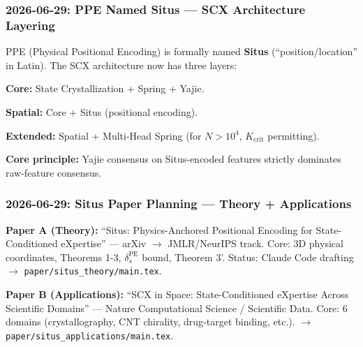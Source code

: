 \documentclass[12pt]{article}
\begin{document}
\subsubsection{2026-06-29: PPE Named Situs --- SCX Architecture Layering}
PPE (Physical Positional Encoding) is formally named \textbf{Situs} (``position/location'' in Latin). The SCX architecture now has three layers:\par
\textbf{Core:} State Crystallization + Spring + Yajie.\par
\textbf{Spatial:} Core + Situs (positional encoding).\par
\textbf{Extended:} Spatial + Multi-Head Spring (for \(N > 10^4\), \(K_{\text{crit}}\) permitting).\par
\textbf{Core principle:} Yajie consensus on Situs-encoded features strictly dominates raw-feature consensus.

\subsubsection{2026-06-29: Situs Paper Planning --- Theory + Applications}
\textbf{Paper A (Theory):} ``Situs: Physics-Anchored Positional Encoding for State-Conditioned eXpertise'' --- arXiv \(\to\) JMLR/NeurIPS track. Core: 3D physical coordinates, Theorems 1-3, \(\delta_s^{\text{PE}}\) bound, Theorem 3'. Status: Claude Code drafting \(\to\) \texttt{paper/situs\_theory/main.tex}.\par
\textbf{Paper B (Applications):} ``SCX in Space: State-Conditioned eXpertise Across Scientific Domains'' --- Nature Computational Science / Scientific Data. Core: 6 domains (crystallography, CNT chirality, drug-target binding, etc.). \(\to\) \texttt{paper/situs\_applications/main.tex}.
\end{document}
